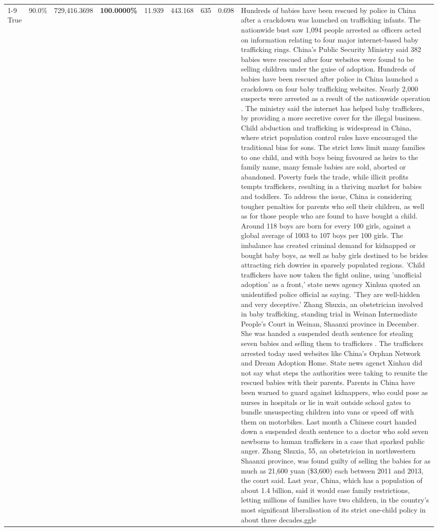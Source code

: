 \begin{table}[H]
\begin{tabular}{lllrlllll}
\cline{1-9}
True & 90.0\% & 729,416.3698 & \bfseries \color{red} 100.0000\% & 11.939 & 443.168 & 635 & 0.698 & Hundreds of babies have been rescued by police in China after a crackdown was launched on trafficking infants. The nationwide bust saw 1,094 people arrested as officers acted on information relating to four major internet-based baby trafficking rings. China's Public Security Ministry said 382 babies were rescued after four websites were found to be selling children under the guise of adoption. Hundreds of babies have been rescued after police in China launched a crackdown on four baby trafficking websites. Nearly 2,000 suspects were arrested as a result of the nationwide operation . The ministry said the internet has helped baby traffickers, by providing a more secretive cover for the illegal business. Child abduction and trafficking is widespread in China, where strict population control rules have encouraged the traditional bias for sons. The strict laws limit many families to one child, and with boys being favoured as heirs to the family name, many female babies are sold, aborted or abandoned. Poverty fuels the trade, while illicit profits tempts traffickers, resulting in a thriving market for babies and toddlers. To address the issue, China is considering tougher penalties for parents who sell their children, as well as for those people who are found to have bought a child. Around 118 boys are born for every 100 girls, against a global average of 1003 to 107 boys per 100 girls. The imbalance has created criminal demand for kidnapped or bought baby boys, as well as baby girls destined to be brides attracting rich dowries in sparsely populated regions. 'Child traffickers have now taken the fight online, using 'unofficial adoption' as a front,' state news agency Xinhua quoted an unidentified police official as saying. 'They are well-hidden and very deceptive.' Zhang Shuxia, an obstetrician involved in baby trafficking, standing trial in Weinan Intermediate People's Court in Weinan, Shaanxi province in December. She was handed a suspended death sentence for stealing seven babies and selling them to traffickers . The traffickers arrested today used websites like China's Orphan Network and Dream Adoption Home. State news agenct Xinhau did not say what steps the authorities were taking to reunite the rescued babies with their parents. Parents in China have been warned to guard against kidnappers, who could pose as nurses in hospitals or lie in wait outside school gates to bundle unsuspecting children into vans or speed off with them on motorbikes. Last month a Chinese court handed down a suspended death sentence to a doctor who sold seven newborns to human traffickers in a case that sparked public anger. Zhang Shuxia, 55, an obstetrician in northwestern Shaanxi province, was found guilty of selling the babies for as much as 21,600 yuan (\$3,600) each between 2011 and 2013, the court said. Last year, China, which has a population of about 1.4 billion, said it would ease family restrictions, letting millions of families have two children, in the country's most significant liberalisation of its strict one-child policy in about three decades.ggle \\

\end{tabular}
\end{table}
